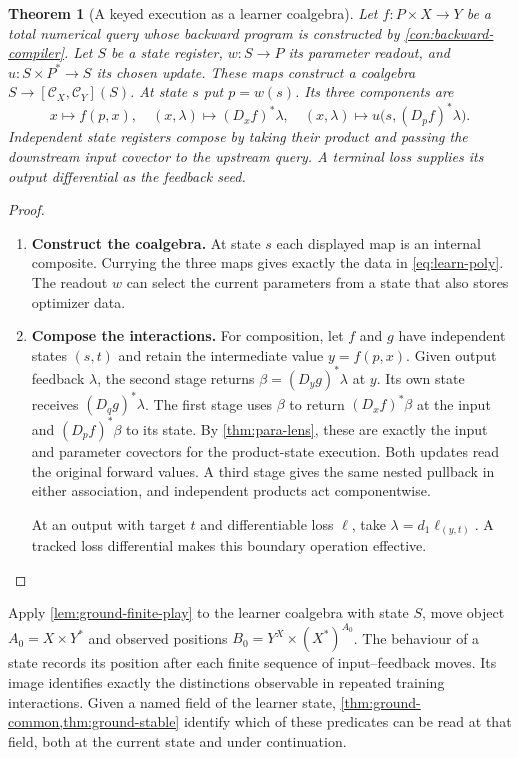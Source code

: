 \documentclass[11pt,a4paper]{article}
\newtheorem{theorem}{Theorem}[section]
\theoremstyle{definition}
\theoremstyle{remark}\newaliascnt{remark}{theorem}
\numberwithin{equation}{section}
\begin{document}
\begin{theorem}[A keyed execution as a learner coalgebra]\label{thm:feedback}
Let $f:P\times X\to Y$ be a total numerical query whose backward program is constructed by \cref{con:backward-compiler}. Let $S$ be a state register, $w:S\to P$ its parameter readout, and $u:S\times P^*\to S$ its chosen update. These maps construct a coalgebra $S\to[\mathcal C_X,\mathcal C_Y](S)$. At state $s$ put $p=w(s)$. Its three components are
\[
 x\mapsto f(p,x),\quad
 (x,\lambda)\mapsto (D_xf)^*\lambda,\quad
 (x,\lambda)\mapsto u\big(s,(D_pf)^*\lambda\big).
\]
Independent state registers compose by taking their product and passing the downstream input covector to the upstream query. A terminal loss supplies its output differential as the feedback seed.
\end{theorem}
\begin{proof}\leavevmode
\begin{enumerate}[titledsteps]
    \item \textbf{Construct the coalgebra.} At state $s$ each displayed map is an internal composite. Currying the three maps gives exactly the data in \cref{eq:learn-poly}. The readout $w$ can select the current parameters from a state that also stores optimizer data.


    \item \textbf{Compose the interactions.} For composition, let $f$ and $g$ have independent states $(s,t)$ and retain the intermediate value $y=f(p,x)$. Given output feedback $\lambda$, the second stage returns $\beta=(D_y g)^*\lambda$ at $y$. Its own state receives $(D_qg)^*\lambda$. The first stage uses $\beta$ to return $(D_x f)^*\beta$ at the input and $(D_p f)^*\beta$ to its state. By \cref{thm:para-lens}, these are exactly the input and parameter covectors for the product-state execution. Both updates read the original forward values. A third stage gives the same nested pullback in either association, and independent products act componentwise.

At an output with target $t$ and differentiable loss $\ell$, take $\lambda=d_1\ell_{(y,t)}$. A tracked loss differential makes this boundary operation effective.\qedhere
\end{enumerate}
\end{proof}
Apply \cref{lem:ground-finite-play} to the learner coalgebra with state $S$, move object $A_0=X\times Y^*$ and observed positions $B_0=Y^X\times(X^*)^{A_0}$. The behaviour of a state records its position after each finite sequence of input--feedback moves. Its image identifies exactly the distinctions observable in repeated training interactions. Given a named field of the learner state, \cref{thm:ground-common,thm:ground-stable} identify which of these predicates can be read at that field, both at the current state and under continuation.
\end{document}
